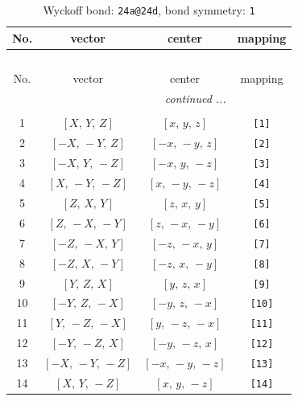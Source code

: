\documentclass[fleqn,8pt]{jsarticle}
\begin{document}
\begin{longtable}{cccc}
\caption{Wyckoff bond: {\tt 24a@24d}, bond symmetry: {\tt 1}}
 \\
 \hline \hline
No. & vector & center & mapping \\ \hline \endfirsthead

\multicolumn{3}{l}{\tablename\ \thetable{}} \\
 \hline \hline
No. & vector & center & mapping \\ \hline \endhead

 \hline \hline
\multicolumn{3}{r}{\footnotesize\it continued ...} \\ \endfoot

 \hline \hline
\multicolumn{3}{r}{} \\ \endlastfoot

1 & $\left[ X,\, Y,\, Z \right]$ & $\left[ x,\, y,\, z \right]$ & {\tt [1]} \\ \hline
2 & $\left[ - X,\, - Y,\, Z \right]$ & $\left[ - x,\, - y,\, z \right]$ & {\tt [2]} \\ \hline
3 & $\left[ - X,\, Y,\, - Z \right]$ & $\left[ - x,\, y,\, - z \right]$ & {\tt [3]} \\ \hline
4 & $\left[ X,\, - Y,\, - Z \right]$ & $\left[ x,\, - y,\, - z \right]$ & {\tt [4]} \\ \hline
5 & $\left[ Z,\, X,\, Y \right]$ & $\left[ z,\, x,\, y \right]$ & {\tt [5]} \\ \hline
6 & $\left[ Z,\, - X,\, - Y \right]$ & $\left[ z,\, - x,\, - y \right]$ & {\tt [6]} \\ \hline
7 & $\left[ - Z,\, - X,\, Y \right]$ & $\left[ - z,\, - x,\, y \right]$ & {\tt [7]} \\ \hline
8 & $\left[ - Z,\, X,\, - Y \right]$ & $\left[ - z,\, x,\, - y \right]$ & {\tt [8]} \\ \hline
9 & $\left[ Y,\, Z,\, X \right]$ & $\left[ y,\, z,\, x \right]$ & {\tt [9]} \\ \hline
10 & $\left[ - Y,\, Z,\, - X \right]$ & $\left[ - y,\, z,\, - x \right]$ & {\tt [10]} \\ \hline
11 & $\left[ Y,\, - Z,\, - X \right]$ & $\left[ y,\, - z,\, - x \right]$ & {\tt [11]} \\ \hline
12 & $\left[ - Y,\, - Z,\, X \right]$ & $\left[ - y,\, - z,\, x \right]$ & {\tt [12]} \\ \hline
13 & $\left[ - X,\, - Y,\, - Z \right]$ & $\left[ - x,\, - y,\, - z \right]$ & {\tt [13]} \\ \hline
14 & $\left[ X,\, Y,\, - Z \right]$ & $\left[ x,\, y,\, - z \right]$ & {\tt [14]} \\ \hline

\end{longtable}
\end{document}
